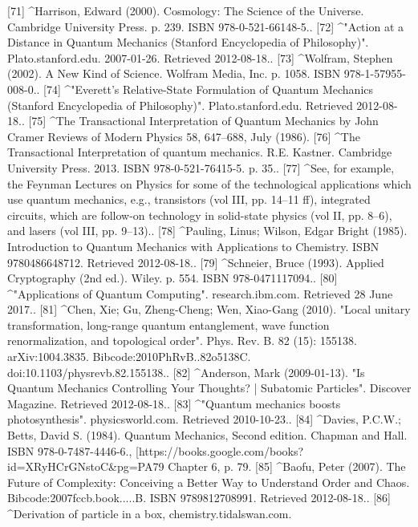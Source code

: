 [71]
^Harrison, Edward (2000). Cosmology: The Science of the Universe. Cambridge University Press. p. 239. ISBN 978-0-521-66148-5..
[72]
^"Action at a Distance in Quantum Mechanics (Stanford Encyclopedia of Philosophy)". Plato.stanford.edu. 2007-01-26. Retrieved 2012-08-18..
[73]
^Wolfram, Stephen (2002). A New Kind of Science. Wolfram Media, Inc. p. 1058. ISBN 978-1-57955-008-0..
[74]
^"Everett's Relative-State Formulation of Quantum Mechanics (Stanford Encyclopedia of Philosophy)". Plato.stanford.edu. Retrieved 2012-08-18..
[75]
^The Transactional Interpretation of Quantum Mechanics by John Cramer Reviews of Modern Physics 58, 647–688, July (1986).
[76]
^The Transactional Interpretation of quantum mechanics. R.E. Kastner. Cambridge University Press. 2013. ISBN 978-0-521-76415-5. p. 35..
[77]
^See, for example, the Feynman Lectures on Physics for some of the technological applications which use quantum mechanics, e.g., transistors (vol III, pp. 14–11 ff), integrated circuits, which are follow-on technology in solid-state physics (vol II, pp. 8–6), and lasers (vol III, pp. 9–13)..
[78]
^Pauling, Linus; Wilson, Edgar Bright (1985). Introduction to Quantum Mechanics with Applications to Chemistry. ISBN 9780486648712. Retrieved 2012-08-18..
[79]
^Schneier, Bruce (1993). Applied Cryptography (2nd ed.). Wiley. p. 554. ISBN 978-0471117094..
[80]
^"Applications of Quantum Computing". research.ibm.com. Retrieved 28 June 2017..
[81]
^Chen, Xie; Gu, Zheng-Cheng; Wen, Xiao-Gang (2010). "Local unitary transformation, long-range quantum entanglement, wave function renormalization, and topological order". Phys. Rev. B. 82 (15): 155138. arXiv:1004.3835. Bibcode:2010PhRvB..82o5138C. doi:10.1103/physrevb.82.155138..
[82]
^Anderson, Mark (2009-01-13). "Is Quantum Mechanics Controlling Your Thoughts? | Subatomic Particles". Discover Magazine. Retrieved 2012-08-18..
[83]
^"Quantum mechanics boosts photosynthesis". physicsworld.com. Retrieved 2010-10-23..
[84]
^Davies, P.C.W.; Betts, David S. (1984). Quantum Mechanics, Second edition. Chapman and Hall. ISBN 978-0-7487-4446-6., [https://books.google.com/books?id=XRyHCrGNstoC&pg=PA79 Chapter 6, p. 79.
[85]
^Baofu, Peter (2007). The Future of Complexity: Conceiving a Better Way to Understand Order and Chaos. Bibcode:2007fccb.book.....B. ISBN 9789812708991. Retrieved 2012-08-18..
[86]
^Derivation of particle in a box, chemistry.tidalswan.com.


